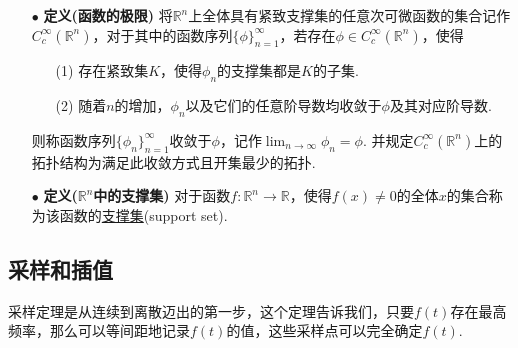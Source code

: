 \documentclass[UTF8]{ctexart}
\begin{document}
\begin{itemize}
    \item [\(\bullet\)] \textbf{定义(函数的极限)}
    \newline
    将\(\mathbb{R}^n\)上全体具有紧致支撑集的任意次可微函数的集合记作\(C_c^{\infty}\left(\mathbb{R}^n\right)\)，对于其中的函数序列\(\{\phi\}_{n=1}^{\infty}\)，若存在\(\phi \in C_c^{\infty}\left(\mathbb{R}^n\right)\)，使得
    \begin{itemize}
        \item [(1)] 存在紧致集\(K\)，使得\(\phi_n\)的支撑集都是\(K\)的子集.
        \item [(2)] 随着\(n\)的增加，\(\phi_n\)以及它们的任意阶导数均收敛于\(\phi\)及其对应阶导数.
    \end{itemize}
    则称函数序列\(\{\phi_n\}_{n=1}^{\infty}\)收敛于\(\phi\)，记作\(\displaystyle{\lim_{n \to \infty}\phi_n=\phi}\). 并规定\(C_c^{\infty}\left(\mathbb{R}^n\right)\)上的拓扑结构为满足此收敛方式且开集最少的拓扑.
\end{itemize}

\begin{itemize}
    \item [\(\bullet\)] \textbf{定义(\(\mathbb{R}^n\)中的支撑集)}
    \newline
    对于函数\(f:\mathbb{R}^n \to \mathbb{R}\)，使得\(f(x) \neq 0\)的全体\(x\)的集合称为该函数的\uline{支撑集}(support set).
\end{itemize}

\subsection{采样和插值}

采样定理是从连续到离散迈出的第一步，这个定理告诉我们，只要\(f(t)\)存在最高频率，那么可以等间距地记录\(f(t)\)的值，这些采样点可以完全确定\(f(t)\).
\end{document}
